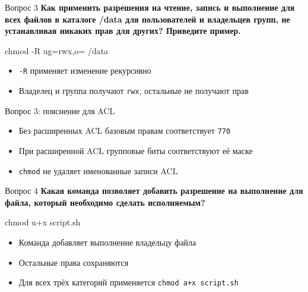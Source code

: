 \documentclass[
  ignorenonframetext,
  aspectratio=169,
  russian,
]{beamer}
\newenvironment{Shaded}{\begin{snugshade}}{\end{snugshade}}
\newcommand{\AttributeTok}[1]{\textcolor[rgb]{0.40,0.45,0.13}{#1}}
\newcommand{\FunctionTok}[1]{\textcolor[rgb]{0.28,0.35,0.67}{#1}}
\newcommand{\NormalTok}[1]{\textcolor[rgb]{0.00,0.23,0.31}{#1}}
\providecommand{\tightlist}{%
  \setlength{\itemsep}{0pt}\setlength{\parskip}{0pt}}
\begin{document}
\begin{frame}[fragile]{Вопрос 3}
\protect{}\label{ux432ux43eux43fux440ux43eux441-3}
\textbf{Как применить разрешения на чтение, запись и выполнение для всех
файлов в каталоге /data для пользователей и владельцев групп, не
устанавливая никаких прав для других? Приведите пример.}

\begin{Shaded}
\begin{Highlighting}[]
\FunctionTok{chmod} \AttributeTok{{-}R}\NormalTok{ ug=rwx,o= /data}
\end{Highlighting}
\end{Shaded}

\begin{itemize}
\tightlist
\item
  \texttt{-R} применяет изменение рекурсивно
\item
  Владелец и группа получают \texttt{rwx}, остальные не получают прав
\end{itemize}
\end{frame}

\begin{frame}[fragile]{Вопрос 3: пояснение для ACL}
\protect{}\label{ux432ux43eux43fux440ux43eux441-3-ux43fux43eux44fux441ux43dux435ux43dux438ux435-ux434ux43bux44f-acl}
\begin{itemize}
\tightlist
\item
  Без расширенных ACL базовым правам соответствует \texttt{770}
\item
  При расширенной ACL групповые биты соответствуют её маске
\item
  \texttt{chmod} не удаляет именованные записи ACL
\end{itemize}
\end{frame}

\begin{frame}[fragile]{Вопрос 4}
\protect{}\label{ux432ux43eux43fux440ux43eux441-4}
\textbf{Какая команда позволяет добавить разрешение на выполнение для
файла, который необходимо сделать исполняемым?}

\begin{Shaded}
\begin{Highlighting}[]
\FunctionTok{chmod}\NormalTok{ u+x script.sh}
\end{Highlighting}
\end{Shaded}

\begin{itemize}
\tightlist
\item
  Команда добавляет выполнение владельцу файла
\item
  Остальные права сохраняются
\item
  Для всех трёх категорий применяется \texttt{chmod\ a+x\ script.sh}
\end{itemize}
\end{frame}
\end{document}
